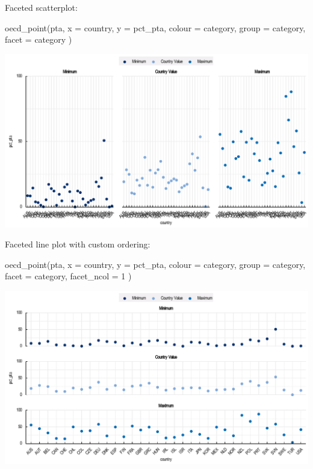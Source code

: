 \documentclass[
  11pt,
  oneside]{report}
\newenvironment{Shaded}{\begin{snugshade}}{\end{snugshade}}
\newcommand{\AttributeTok}[1]{\textcolor[rgb]{0.77,0.63,0.00}{#1}}
\newcommand{\DecValTok}[1]{\textcolor[rgb]{0.00,0.00,0.81}{#1}}
\newcommand{\FunctionTok}[1]{\textcolor[rgb]{0.00,0.00,0.00}{#1}}
\newcommand{\NormalTok}[1]{#1}
\begin{document}
Faceted scatterplot:

\begin{Shaded}
\begin{Highlighting}[]
\FunctionTok{oecd\_point}\NormalTok{(pta,}
  \AttributeTok{x =}\NormalTok{ country, }\AttributeTok{y =}\NormalTok{ pct\_pta, }\AttributeTok{colour =}\NormalTok{ category, }\AttributeTok{group =}\NormalTok{ category,}
  \AttributeTok{facet =}\NormalTok{ category}
\NormalTok{)}
\end{Highlighting}
\end{Shaded}

\begin{center}\includegraphics{book_figures/sp2-1} \end{center}

Faceted line plot with custom ordering:

\begin{Shaded}
\begin{Highlighting}[]
\FunctionTok{oecd\_point}\NormalTok{(pta,}
  \AttributeTok{x =}\NormalTok{ country, }\AttributeTok{y =}\NormalTok{ pct\_pta, }\AttributeTok{colour =}\NormalTok{ category, }\AttributeTok{group =}\NormalTok{ category,}
  \AttributeTok{facet =}\NormalTok{ category, }\AttributeTok{facet\_ncol =} \DecValTok{1}
\NormalTok{)}
\end{Highlighting}
\end{Shaded}

\begin{center}\includegraphics{book_figures/sp3-1} \end{center}
\end{document}
